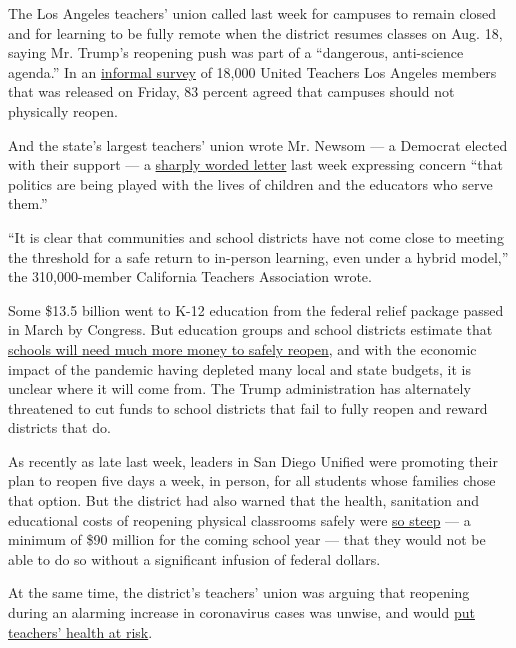 The Los Angeles teachers' union called last week for campuses to remain
closed and for learning to be fully remote when the district resumes
classes on Aug. 18, saying Mr. Trump's reopening push was part of a
``dangerous, anti-science agenda.'' In an
\href{https://www.utla.net/news/poll-results-83-utla-members-say-lausd-schools-should-not-physically-reopen-august-18}{informal
survey} of 18,000 United Teachers Los Angeles members that was released
on Friday, 83 percent agreed that campuses should not physically reopen.

And the state's largest teachers' union wrote Mr. Newsom --- a Democrat
elected with their support --- a
\href{http://image.cta-mailings.org/lib/fe8a1574766d017b7c/m/2/2167fb86-b25b-4ce3-9bc7-4248b105a80d.pdf?fbclid=IwAR2QqpANyH9HwsSJJjE1-1NyK_r8bxIcrqucygKKV1ehQ-i_JYCwt3kksZg}{sharply
worded letter} last week expressing concern ``that politics are being
played with the lives of children and the educators who serve them.''

``It is clear that communities and school districts have not come close
to meeting the threshold for a safe return to in-person learning, even
under a hybrid model,'' the 310,000-member California Teachers
Association wrote.

Some \$13.5 billion went to K-12 education from the federal relief
package passed in March by Congress. But education groups and school
districts estimate that
\href{https://www.nytimes3xbfgragh.onion/2020/07/09/us/schools-reopening-trump.html}{schools
will need much more money to safely reopen}, and with the economic
impact of the pandemic having depleted many local and state budgets, it
is unclear where it will come from. The Trump administration has
alternately threatened to cut funds to school districts that fail to
fully reopen and reward districts that do.

As recently as late last week, leaders in San Diego Unified were
promoting their plan to reopen five days a week, in person, for all
students whose families chose that option. But the district had also
warned that the health, sanitation and educational costs of reopening
physical classrooms safely were
\href{https://www.nytimes3xbfgragh.onion/2020/07/09/us/schools-reopening-trump.html}{so
steep} --- a minimum of \$90 million for the coming school year --- that
they would not be able to do so without a significant infusion of
federal dollars.

At the same time, the district's teachers' union was arguing that
reopening during an alarming increase in coronavirus cases was unwise,
and would
\href{https://www.nytimes3xbfgragh.onion/2020/07/11/us/virus-teachers-classrooms.html}{put
teachers' health at risk}.

